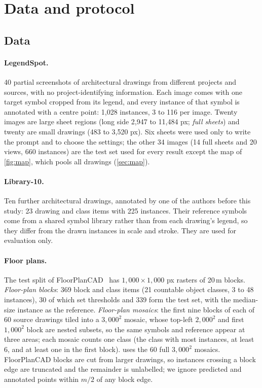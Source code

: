 \section{Data and protocol}
\label{sec:protocol-full}

\subsection{Data}
\label{sec:data}

\paragraph{LegendSpot.} 40 partial screenshots of architectural drawings from different projects and sources, with no project-identifying information. Each image comes with one target symbol cropped from its legend, and every instance of that symbol is annotated with a centre point: 1{,}028 instances, 3 to 116 per image. Twenty images are large sheet regions (long side 2{,}947 to 11{,}484 px; \emph{full sheets}) and twenty are small drawings (483 to 3{,}520 px). Six sheets were used only to write the prompt and to choose the settings; the other 34 images (14 full sheets and 20 views, 660 instances) are the test set used for every result except the map of \cref{fig:map}, which pools all drawings (\cref{sec:map}).

\paragraph{Library-10.} Ten further architectural drawings, annotated by one of the authors before this study: 23 drawing and class items with 225 instances. Their reference symbols come from a shared symbol library rather than from each drawing's legend, so they differ from the drawn instances in scale and stroke. They are used for evaluation only.

\paragraph{Floor plans.} The test split of FloorPlanCAD~\cite{fan2021floorplancad} has $1{,}000 \times 1{,}000$ px rasters of 20\,m blocks. \emph{Floor-plan blocks}: 369 block and class items (21 countable object classes, 3 to 48 instances), 30 of which set thresholds and 339 form the test set, with the median-size instance as the reference. \emph{Floor-plan mosaics}: the first nine blocks of each of 60 source drawings tiled into a $3{,}000^2$ mosaic, whose top-left $2{,}000^2$ and first $1{,}000^2$ block are nested subsets, so the same symbols and reference appear at three areas; each mosaic counts one class (the class with most instances, at least 6, and at least one in the first block).  uses the 60 full $3{,}000^2$ mosaics. FloorPlanCAD blocks are cut from larger drawings, so instances crossing a block edge are truncated and the remainder is unlabelled; we ignore predicted and annotated points within $m/2$ of any block edge.

